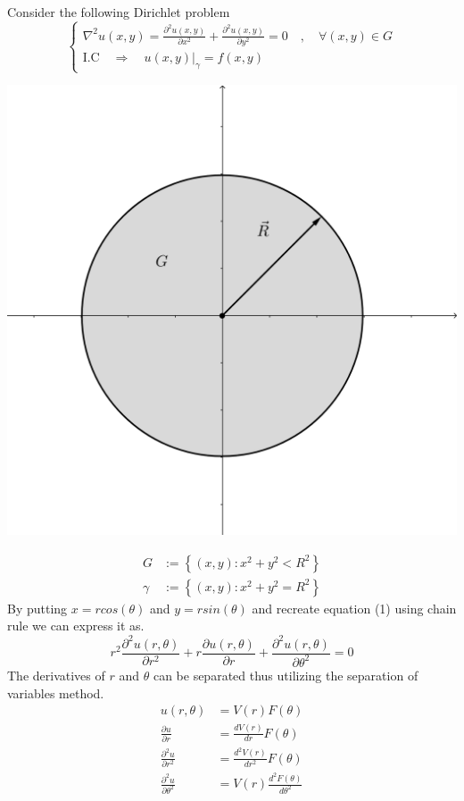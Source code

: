 Consider the following Dirichlet problem
\begin{equation}
    \begin{cases}
        \displaystyle \nabla^2 u(x,y) = \frac{\partial^2 u(x,y)}{\partial x^2} + \frac{\partial^2 u(x,y)}{\partial y^2} = 0 \quad,\quad \forall (x,y) \in G
        \\
        \text{I.C} \quad \Longrightarrow \quad u(x,y)|_\gamma = f(x,y)
    \end{cases}
\end{equation}
\begin{center}
\includegraphics[scale=0.14]{circle.png}
\end{center}
\begin{align*}
G &:= \left\lbrace (x,y):x^2+y^2 < R^2 \right\rbrace
\\
\gamma &:= \left\lbrace (x,y):x^2+y^2 = R^2 \right\rbrace
\end{align*}
By putting $x = r cos(\theta)$ and $y = r sin(\theta)$ and recreate equation (1) using chain rule we can express it as.
\[
    r^2 \frac{\partial^2 u(r,\theta)}{\partial r^2} + r \frac{\partial u(r,\theta)}{\partial r} + \frac{\partial^2 u(r,\theta)}{\partial \theta^2} = 0    
\]
The derivatives of $r$ and $\theta$ can be separated thus utilizing the separation of variables method.
\begin{align*}
u(r,\theta) &= V(r)F(\theta)
\\
\frac{\partial u}{\partial r} &= \frac{d V(r)}{dr}F(\theta)
\\
\frac{\partial^2 u}{\partial r^2} &= \frac{d^2 V(r)}{dr^2}F(\theta)
\\
\frac{\partial^2 u}{\partial \theta^2} &= V(r)\frac{d^2 F(\theta)}{d\theta^2}
\end{align*}
